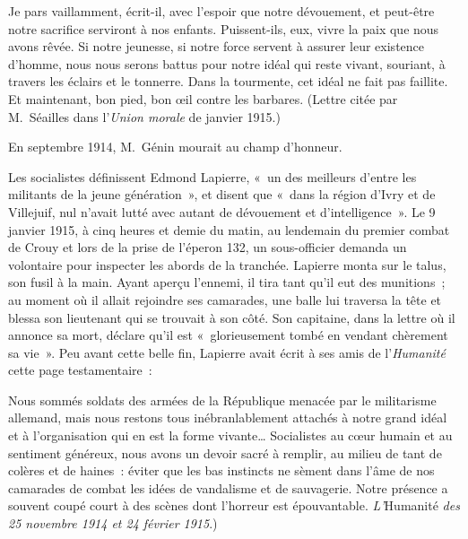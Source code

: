 \documentclass[french,twoside]{book} %
\newenvironment{quoteblock}%
  {\begin{quoting}}
  {\end{quoting}}
\newenvironment{quotebar}{%
    \def\FrameCommand{{\color{rubric!10!}\vrule width 0.5em} \hspace{0.9em}}%
    \def\OuterFrameSep{\itemsep} %
    \MakeFramed {\advance\hsize-\width \FrameRestore}
  }%
  {%
    \endMakeFramed
  }
\renewenvironment{quoteblock}%
  {%
    \savenotes
    \setstretch{0.9}
    \normalfont
    \begin{quotebar}
  }
  {%
    \end{quotebar}
    \spewnotes
  }
\begin{document}
\begin{quoteblock}
 \noindent Je pars vaillamment, écrit-il, avec l’espoir que notre dévouement, et peut-être notre sacrifice serviront à nos enfants. Puissent-ils, eux, vivre la paix que nous avons rêvée. Si notre jeunesse, si notre force servent à assurer leur existence d’homme, nous nous serons battus pour notre idéal qui reste vivant, souriant, à travers les éclairs et le tonnerre. Dans la tourmente, cet idéal ne fait pas faillite. Et maintenant, bon pied, bon œil contre les barbares. (Lettre citée par M. Séailles dans l’{\itshape Union morale} de janvier 1915.)‌
 \end{quoteblock}

\noindent En septembre 1914, M. Génin mourait au champ d’honneur.\par
Les socialistes définissent Edmond Lapierre, « un des meilleurs d’entre les militants de la jeune génération », et disent que « dans la région d’Ivry et de Villejuif, nul n’avait lutté avec autant de dévouement et d’intelligence ». Le 9 janvier 1915, à cinq heures et demie du matin, au lendemain du premier combat de Crouy et lors de la prise de l’éperon 132, un sous-officier demanda un volontaire pour inspecter les abords de la tranchée. Lapierre monta sur le talus, son fusil à la main. Ayant aperçu l’ennemi, il tira tant qu’il eut des munitions ; au moment où il allait rejoindre ses camarades, une balle lui traversa la tête et blessa son lieutenant qui se trouvait à son côté. Son capitaine, dans la lettre où il annonce sa mort, déclare qu’il est « glorieusement tombé en vendant chèrement sa vie ». Peu avant cette belle fin, Lapierre avait écrit à ses amis de l’{\itshape Humanité} cette page testamentaire :‌\par

\begin{quoteblock}
 \noindent Nous sommés soldats des armées de la République menacée par le militarisme allemand, mais nous restons tous inébranlablement attachés à notre grand idéal et à l’organisation qui en est la forme vivante… Socialistes au cœur humain et au sentiment généreux, nous avons un devoir sacré à remplir, au milieu de tant de colères et de haines : éviter que les bas instincts ne sèment dans l’âme de nos camarades de combat les idées de vandalisme et de sauvagerie. Notre présence a souvent coupé court à des scènes dont l’horreur est épouvantable. {\itshape L’}Humanité {\itshape des 25 novembre 1914 et 24 février 1915}.)‌
 \end{quoteblock}
\end{document}
